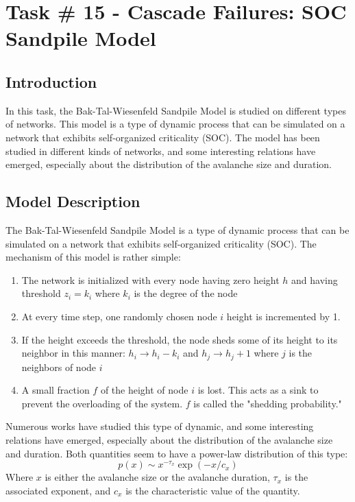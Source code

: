 \chapter{Task \# 15 - Cascade Failures: SOC Sandpile Model}

\section{Introduction}
In this task, the Bak-Tal-Wiesenfeld Sandpile Model\cite{SandpileModel} is studied on different types of networks. This model is a type of dynamic process that can be simulated on a network that exhibits self-organized criticality (SOC). The model has been studied in different kinds of networks, and some interesting relations have emerged, especially about the distribution of the avalanche size and duration.

\section{Model Description}

The Bak-Tal-Wiesenfeld Sandpile Model\cite{SandpileModel} is a type of dynamic process that can be simulated on a network that exhibits self-organized criticality (SOC).
The mechanism of this model is rather simple:
\begin{enumerate}
    \item The network is initialized with every node having zero height $h$ and having threshold $z_i = k_i$ where $k_i$ is the degree of the node
    \item At every time step, one randomly chosen node $i$ height is incremented by 1.
    \item If the height exceeds the threshold, the node sheds some of its height to its neighbor in this manner: $h_i \rightarrow h_i - k_i$ and $h_j \rightarrow h_j + 1$ where $j$ is the neighbors of node $i$
    \item A small fraction $f$ of the height of node $i$ is lost. This acts as a sink to prevent the overloading of the system. $f$ is called the "shedding probability."
\end{enumerate}

Numerous works have studied this type of dynamic, and some interesting relations have emerged, especially about the distribution of the avalanche size and duration.
Both quantities seem to have a power-law distribution of this type:
$$p(x) \sim x^{-\tau_x}\exp{(-x/c_x)}$$
Where $x$ is either the avalanche size or the avalanche duration, $\tau_x$ is the associated exponent, and $c_x$ is the characteristic value of the quantity. \cite{scale_free_sandpile}


